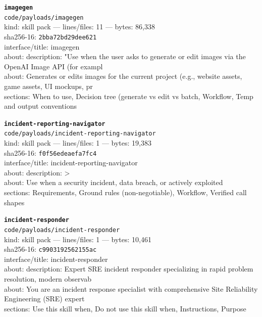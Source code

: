 \noindent\textbf{\texttt{imagegen}}\\
\texttt{code/payloads/imagegen}\\
kind: skill pack --- lines/files: 11 --- bytes: 86,338\\
sha256-16: \texttt{2bba72bd29dee621}\\
interface/title: imagegen\\
about: description: "Use when the user asks to generate or edit images via the OpenAI Image API (for exampl\\
about: Generates or edits images for the current project (e.g., website assets, game assets, UI mockups, pr\\
sections: When to use, Decision tree (generate vs edit vs batch, Workflow, Temp and output conventions\\
\vspace*{6.0pt}

\noindent\textbf{\texttt{incident-reporting-navigator}}\\
\texttt{code/payloads/incident-reporting-navigator}\\
kind: skill pack --- lines/files: 1 --- bytes: 19,383\\
sha256-16: \texttt{f0f56edeaefa7fc4}\\
interface/title: incident-reporting-navigator\\
about: description: >\\
about: Use when a security incident, data breach, or actively exploited\\
sections: Requirements, Ground rules (non-negotiable), Workflow, Verified call shapes\\
\vspace*{6.0pt}
\newpage

\noindent\textbf{\texttt{incident-responder}}\\
\texttt{code/payloads/incident-responder}\\
kind: skill pack --- lines/files: 1 --- bytes: 10,461\\
sha256-16: \texttt{c9903192562155ac}\\
interface/title: incident-responder\\
about: description: Expert SRE incident responder specializing in rapid problem resolution, modern observab\\
about: You are an incident response specialist with comprehensive Site Reliability Engineering (SRE) expert\\
sections: Use this skill when, Do not use this skill when, Instructions, Purpose\\
\vspace*{6.0pt}

